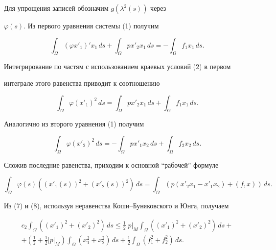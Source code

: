  


\begin{pf} 


Для упрощения записей обозначим $g(\lambda^2(s))$ через 


$\varphi(s)$. Из первого уравнения системы (1) получим 


$$ 


\int_\Omega(\varphi x'_1)'x_1\,ds+ 


\int_\Omega p x'_2x_1\,ds=-\int_\Omega 


f_1x_1\,ds. 


$$ 


Интегрирование по частям с использованием краевых условий (2) в первом 


интеграле этого равенства приводит к соотношению 


$$ 


\int_\Omega\varphi(x'_1)^2\,ds=\int_\Omega 


p x'_2x_1\,ds+\int_\Omega f_1x_1\,ds. 


$$ 


Аналогично из второго уравнения (1) получим 


$$ 


\int_\Omega \varphi(x'_2)^2\,ds=-\int_\Omega 


p x'_1x_2\,ds+\int_\Omega f_2x_2\,ds. 


$$ 


Сложив последние равенства, приходим к основной ``рабочей'' формуле 


\begin{equation} 


\int_\Omega\varphi(s)((x'_1(s))^2+(x'_2(s))^2)\,ds= 


\int_\Omega(p(x'_2x_1-x'_1x_2)+(f,x))\,ds. 


\end{equation} 


Из (7) и (8), используя неравенства Коши--Буняковского и Юнга, получаем 


\begin{multline} 


c_2\int_\Omega((x'_1)^2+(x'_2)^2)\,ds\le\tfrac{1}{2}|p|_M 


\int_\Omega((x'_1)^2+(x'_2)^2)\,ds+ \\ 


+(\tfrac{1}{2}+\tfrac{1}{2}|p|_M)\int_\Omega 


(x^2_1+x^2_2)\,ds+\tfrac{1}{2}\int_\Omega 


(f^2_1+f^2_2)\,ds. 



\end{multline}
\end{pf}
